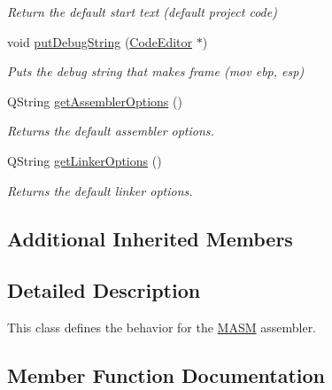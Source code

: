 \begin{DoxyCompactItemize}
\begin{DoxyCompactList}\small\item\em Return the default start text (default project code) \end{DoxyCompactList}\item 
\hypertarget{class_m_a_s_m_a915477aac930ce89f5c723557e7edfa4}{}void \hyperlink{class_m_a_s_m_a915477aac930ce89f5c723557e7edfa4}{put\+Debug\+String} (\hyperlink{class_code_editor}{Code\+Editor} $\ast$)\label{class_m_a_s_m_a915477aac930ce89f5c723557e7edfa4}

\begin{DoxyCompactList}\small\item\em Puts the debug string that makes frame (mov ebp, esp) \end{DoxyCompactList}\item 
\hypertarget{class_m_a_s_m_a6b2a173588895bb951992296d80658fc}{}Q\+String \hyperlink{class_m_a_s_m_a6b2a173588895bb951992296d80658fc}{get\+Assembler\+Options} ()\label{class_m_a_s_m_a6b2a173588895bb951992296d80658fc}

\begin{DoxyCompactList}\small\item\em Returns the default assembler options. \end{DoxyCompactList}\item 
\hypertarget{class_m_a_s_m_ae0d538ab3fcaa65e85bab4eb12e6895e}{}Q\+String \hyperlink{class_m_a_s_m_ae0d538ab3fcaa65e85bab4eb12e6895e}{get\+Linker\+Options} ()\label{class_m_a_s_m_ae0d538ab3fcaa65e85bab4eb12e6895e}

\begin{DoxyCompactList}\small\item\em Returns the default linker options. \end{DoxyCompactList}\end{DoxyCompactItemize}
\subsection*{Additional Inherited Members}


\subsection{Detailed Description}
This class defines the behavior for the \hyperlink{class_m_a_s_m}{M\+A\+S\+M} assembler. 



\subsection{Member Function Documentation}
\hypertarget{class_m_a_s_m_a946690c33e0a66a0a91acd857870ffdb}{}

